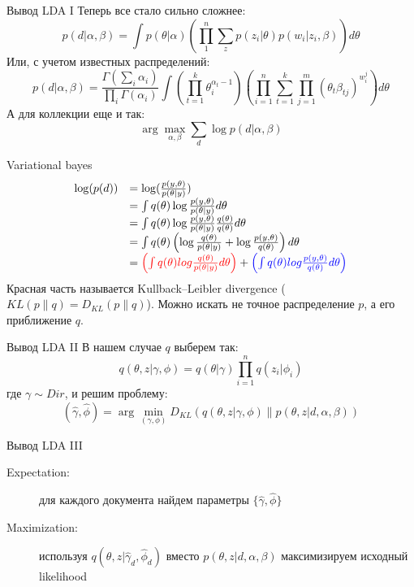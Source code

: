 \documentclass[14pt, fleqn, xcolor={dvipsnames, table}]{beamer}
\begin{document}
\begin{frame}{Вывод LDA I}
\small
Теперь все стало сильно сложнее:
$$
p(d|\alpha, \beta) = \int p(\theta | \alpha)\left(\prod_1^n\sum_{z}p(z_i|\theta)p(w_i|z_i,\beta)\right) d\theta
$$
Или, с учетом известных распределений:
$$
p(d|\alpha, \beta) = \frac{\Gamma\left(\sum_i\alpha_i\right)}{\prod_i \Gamma(\alpha_i)} \int \left(\prod_{t=1}^k \theta^{\alpha_t-1}_i\right)\left(\prod_{i=1}^n\sum_{t=1}^k\prod_{j=1}^m(\theta_t\beta_{tj})^{w_i^j}\right)d\theta
$$
А для коллекции еще и так:
$$
\arg \max_{\alpha, \beta} \sum_d \log p(d|\alpha, \beta)
$$
\end{frame}

\begin{frame}{Variational bayes}
$$\begin{array}{ll}
\log(p(d)) &= \log(\frac{p(y,\theta)}{p(\theta|y)}) \\
&= \int q(\theta) \log \frac{p(y,\theta)}{p(\theta|y)} d\theta \\
&= \int q(\theta) \log \frac{p(y,\theta)}{p(\theta|y)}\frac{q(\theta)}{q(\theta)} d\theta \\
&= \int q(\theta) \left(\log \frac{q(\theta)}{p(\theta|y)} + \log \frac{p(y,\theta)}{q(\theta)}\right) d\theta \\
&= {\color{red}\left(\int q(\theta) log \frac{q(\theta)}{p(\theta|y)}d\theta\right)} + {\color{blue}\left(\int q(\theta) log \frac{p(y,\theta)}{q(\theta)} d\theta\right)} \\
\end{array}$$
Красная часть называется Kullback–Leibler divergence ($KL(p\|q)=D_{KL}(p\|q)$). Можно искать не точное распределение $p$, а его приближение $q$.
\end{frame}

\begin{frame}{Вывод LDA II}
В нашем случае $q$ выберем так:
$$
q(\theta,z|\gamma,\phi) = q(\theta|\gamma) \prod_{i=1}^n q(z_i | \phi_i)
$$
где $\gamma \sim Dir$, и решим проблему:
$$
(\hat{\gamma},\hat{\phi}) = \arg \min_{(\gamma,\phi)} D_{KL}(q(\theta,z|\gamma,\phi)\|p(\theta, z|d,\alpha,\beta))
$$
\end{frame}

\begin{frame}{Вывод LDA III}
\begin{description}
  \item[Expectation:] для каждого документа найдем параметры $\{\hat{\gamma}, \hat{\phi}\}$
  \item[Maximization:] используя $q(\theta,z|\hat{\gamma}_d, \hat{\phi}_d)$ вместо $p(\theta,z|d,\alpha, \beta)$ максимизируем исходный likelihood
\end{description}
\end{frame}
\end{document}
